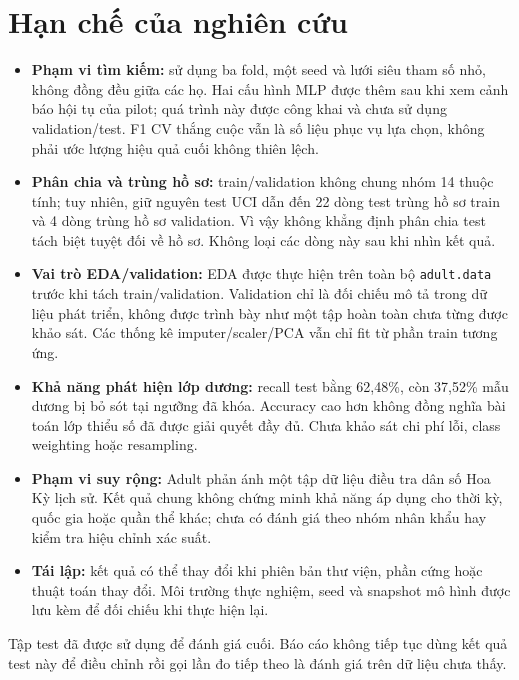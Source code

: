 \section{Hạn chế của nghiên cứu}
\label{sec:7_2}
\begin{itemize}
\item \textbf{Phạm vi tìm kiếm:} sử dụng ba fold, một seed và lưới siêu tham số nhỏ, không đồng đều giữa các họ. Hai cấu hình MLP được thêm sau khi xem cảnh báo hội tụ của pilot; quá trình này được công khai và chưa sử dụng validation/test. F1 CV thắng cuộc vẫn là số liệu phục vụ lựa chọn, không phải ước lượng hiệu quả cuối không thiên lệch.
\item \textbf{Phân chia và trùng hồ sơ:} train/validation không chung nhóm 14 thuộc tính; tuy nhiên, giữ nguyên test UCI dẫn đến 22 dòng test trùng hồ sơ train và 4 dòng trùng hồ sơ validation. Vì vậy không khẳng định phân chia test tách biệt tuyệt đối về hồ sơ. Không loại các dòng này sau khi nhìn kết quả.
\item \textbf{Vai trò EDA/validation:} EDA được thực hiện trên toàn bộ \texttt{adult.data} trước khi tách train/validation. Validation chỉ là đối chiếu mô tả trong dữ liệu phát triển, không được trình bày như một tập hoàn toàn chưa từng được khảo sát. Các thống kê imputer/scaler/PCA vẫn chỉ fit từ phần train tương ứng.
\item \textbf{Khả năng phát hiện lớp dương:} recall test bằng 62,48\%, còn 37,52\% mẫu dương bị bỏ sót tại ngưỡng đã khóa. Accuracy cao hơn không đồng nghĩa bài toán lớp thiểu số đã được giải quyết đầy đủ. Chưa khảo sát chi phí lỗi, class weighting hoặc resampling.
\item \textbf{Phạm vi suy rộng:} Adult phản ánh một tập dữ liệu điều tra dân số Hoa Kỳ lịch sử. Kết quả chung không chứng minh khả năng áp dụng cho thời kỳ, quốc gia hoặc quần thể khác; chưa có đánh giá theo nhóm nhân khẩu hay kiểm tra hiệu chỉnh xác suất.
\item \textbf{Tái lập:} kết quả có thể thay đổi khi phiên bản thư viện, phần cứng hoặc thuật toán thay đổi. Môi trường thực nghiệm, seed và snapshot mô hình được lưu kèm để đối chiếu khi thực hiện lại.
\end{itemize}
Tập test đã được sử dụng để đánh giá cuối. Báo cáo không tiếp tục dùng kết quả test này để điều chỉnh rồi gọi lần đo tiếp theo là đánh giá trên dữ liệu chưa thấy.
